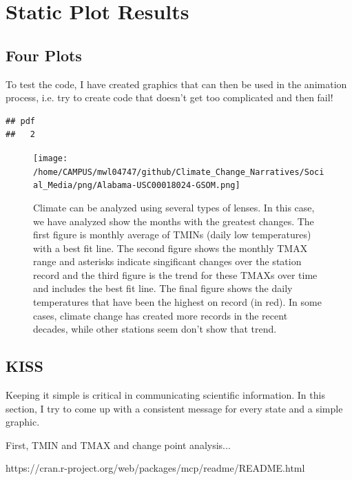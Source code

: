 \documentclass{article}\usepackage[]{graphicx}\usepackage[]{color}
\makeatletter
\newenvironment{kframe}{%
 \def\at@end@of@kframe{}%
 \ifinner\ifhmode%
  \def\at@end@of@kframe{\end{minipage}}%
  \begin{minipage}{\columnwidth}%
 \fi\fi%
 \def\FrameCommand##1{\hskip\@totalleftmargin \hskip-\fboxsep
 \colorbox{shadecolor}{##1}\hskip-\fboxsep
     \hskip-\linewidth \hskip-\@totalleftmargin \hskip\columnwidth}%
 \MakeFramed {\advance\hsize-\width
   \@totalleftmargin\z@ \linewidth\hsize
   \@setminipage}}%
 {\par\unskip\endMakeFramed%
 \at@end@of@kframe}
\newenvironment{knitrout}{}{} %
\makeatother
\begin{document}
\section{Static Plot Results}

\subsection{Four Plots}

To test the code, I have created graphics that can then be used in the animation process, i.e. try to create code that doesn't get too complicated and then fail! 

\begin{knitrout}
\color{fgcolor}\begin{kframe}
\begin{verbatim}
## pdf 
##   2
\end{verbatim}
\end{kframe}
\end{knitrout}

\begin{figure}
\texttt{[image: /home/CAMPUS/mwl04747/github/Climate\_Change\_Narratives/Social\_Media/png/Alabama-USC00018024-GSOM.png]}
\caption{Climate can be analyzed using several types of lenses. In this case, we have analyzed show the months with the greatest changes. The first figure is monthly average of TMINs (daily low temperatures) with a best fit line. The second figure shows the monthly TMAX range and asterisks indicate singificant changes over the station record and the third figure is the trend for these TMAXs over time and includes the best fit line. The final figure shows the daily temperatures that have been the highest on record (in red). In some cases, climate change has created more records in the recent decades, while other stations seem don't show that trend.}
\label{fig:GSOM}
\end{figure}

\subsection{KISS}

Keeping it simple is critical in communicating scientific information. In this section, I try to come up with a consistent message for every state and a simple graphic. 

First, TMIN and TMAX and change point analysis...

https://cran.r-project.org/web/packages/mcp/readme/README.html
\end{document}
